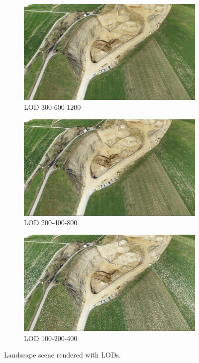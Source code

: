 \begin{figure}[h]
    \centering
    
    \begin{subfigure}{0.7\textwidth}
        \centering
        \includegraphics[width=\textwidth]{figs/results/lod-landscape-300.jpg}
        \caption{LOD 300-600-1200}
    \end{subfigure}
    
    \begin{subfigure}{0.7\textwidth}
        \centering
        \includegraphics[width=\textwidth]{figs/results/lod-landscape-200.jpg}
        \caption{LOD 200-400-800}
    \end{subfigure}
    
    \begin{subfigure}{0.7\textwidth}
        \centering
        \includegraphics[width=\textwidth]{figs/results/lod-landscape-100.jpg}
        \caption{LOD 100-200-400}
    \end{subfigure}
    
    \caption{Landscape scene rendered with LODs.}
\end{figure}

